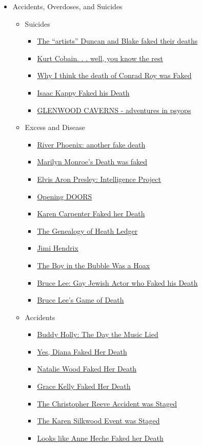 \documentclass{article}
\newcommand{\insertmydocument}[2]{ %
  \item \href{http://www.mileswmathis.com/#2}{#1}
}
\begin{document}
\begin{itemize}
  \item Accidents, Overdoses, and Suicides
  \begin{itemize}

    \item Suicides
    \begin{itemize}

      \insertmydocument{The “artists” Duncan and Blake faked their deaths}{golden.pdf}
      \insertmydocument{Kurt Cobain. . . well, you know the rest}{cobain.pdf}
      \insertmydocument{Why I think the death of Conrad Roy was Faked}{roy.pdf}
      \insertmydocument{Isaac Kappy Faked his Death}{kappy.pdf}
      \insertmydocument{GLENWOOD CAVERNS - adventures in psyops}{glenwood.pdf}

    \end{itemize}

    \item Excess and Disease
    \begin{itemize}

      \insertmydocument{River Phoenix: another fake death}{river.pdf}
      \insertmydocument{Marilyn Monroe's Death was faked}{monroe.pdf}
      \insertmydocument{Elvis Aron Presley: Intelligence Project}{elvis.pdf}
      \insertmydocument{Opening DOORS}{kilmer.pdf}
      \insertmydocument{Karen Carpenter Faked her Death}{carp.pdf}
      \insertmydocument{The Genealogy of Heath Ledger}{heath.pdf}
      \insertmydocument{Jimi Hendrix}{jimi.pdf}
      \insertmydocument{The Boy in the Bubble Was a Hoax}{bubbleboy.pdf}
      \insertmydocument{Bruce Lee: Gay Jewish Actor who Faked his Death}{hos.pdf}
      \insertmydocument{Bruce Lee’s Game of Death}{blee2.pdf}

    \end{itemize}

    \item Accidents
    \begin{itemize}

      \insertmydocument{Buddy Holly: The Day the Music Lied}{holly.pdf}
      \insertmydocument{Yes, Diana Faked Her Death}{diana.pdf}
      \insertmydocument{Natalie Wood Faked Her Death}{natwood.pdf}
      \insertmydocument{Grace Kelly Faked Her Death}{grace.pdf}
      \insertmydocument{The Christopher Reeve Accident was Staged}{reeve2.pdf}
      \insertmydocument{The Karen Silkwood Event was Staged}{silk.pdf}
      \insertmydocument{Looks like Anne Heche Faked her Death}{heche.pdf}

    \end{itemize}


\end{itemize}
\end{itemize}
\end{document}
